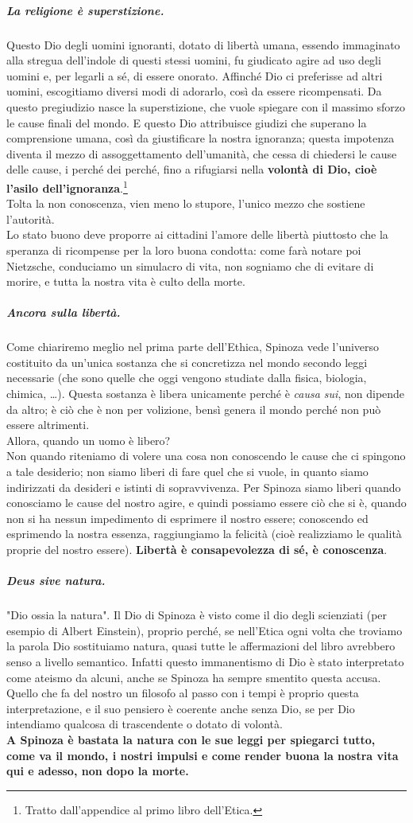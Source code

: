 \subparagraph{La religione è superstizione.} Questo Dio degli uomini ignoranti, dotato di libertà umana, essendo immaginato alla stregua dell'indole di questi stessi uomini, fu giudicato agire ad uso degli uomini e, per legarli a sé, di essere onorato. Affinché Dio ci preferisse ad altri uomini, escogitiamo diversi modi di adorarlo, così da essere ricompensati. Da questo pregiudizio nasce la superstizione, che vuole spiegare con il massimo sforzo le cause finali del mondo. E questo Dio attribuisce giudizi che superano la comprensione umana, così da giustificare la nostra ignoranza; questa impotenza diventa il mezzo di assoggettamento dell'umanità, che cessa di chiedersi le cause delle cause, i perché dei perché, fino a rifugiarsi nella  \textbf{volontà di Dio, cioè l'asilo dell'ignoranza}.\footnote{Tratto dall'appendice al primo libro dell'Etica.}\\
Tolta la non conoscenza, vien meno lo stupore, l'unico mezzo che sostiene l'autorità.\\
Lo stato buono deve proporre ai cittadini l'amore delle libertà piuttosto che la speranza di ricompense per la loro buona condotta: come farà notare poi Nietzsche, conduciamo un simulacro di vita, non sogniamo che di evitare di morire, e tutta la nostra vita è culto della morte.
\subparagraph{Ancora sulla libertà.} Come chiariremo meglio nel prima parte dell'Ethica, Spinoza vede l'universo costituito da un'unica sostanza che si concretizza nel mondo secondo leggi necessarie (che sono quelle che oggi vengono studiate dalla fisica, biologia, chimica, \dots). Questa sostanza è libera unicamente perché è \textit{causa sui}, non dipende da altro; è ciò che è non per volizione, bensì genera il mondo perché non può essere altrimenti.\\
Allora, quando un uomo è libero?\\
Non quando riteniamo di volere una cosa non conoscendo le cause che ci spingono a tale desiderio; non siamo liberi di fare quel che si vuole, in quanto siamo indirizzati da desideri e istinti di sopravvivenza. Per Spinoza siamo liberi quando conosciamo le cause del nostro agire, e quindi possiamo essere ciò che si è, quando non si ha nessun impedimento di esprimere il nostro essere; conoscendo ed esprimendo la nostra essenza, raggiungiamo la felicità (cioè realizziamo le qualità proprie del nostro essere). \textbf{Libertà è consapevolezza di sé, è conoscenza}.
\subparagraph{Deus sive natura.} "Dio ossia la natura". Il Dio di Spinoza è visto come il dio degli scienziati (per esempio di Albert Einstein), proprio perché, se nell'Etica ogni volta che troviamo la parola Dio sostituiamo natura, quasi tutte le affermazioni del libro avrebbero senso a livello semantico. Infatti questo immanentismo di Dio è stato interpretato come ateismo da alcuni, anche se Spinoza ha sempre smentito questa accusa. Quello che fa del nostro un filosofo al passo con i tempi è proprio questa interpretazione, e il suo pensiero è coerente anche senza Dio, se per Dio intendiamo qualcosa di trascendente o dotato di volontà.\\
\textbf{A Spinoza è bastata la natura con le sue leggi per spiegarci tutto, come va il mondo, i nostri impulsi e come render buona la nostra vita qui e adesso, non dopo la morte.}
\newpage